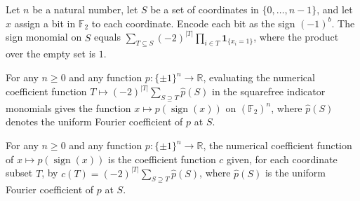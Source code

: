 \begin{theorem}
\label{FABL.monomial_binaryCubeSignEquiv_eq_numerical_sum}
\leanok
{}
Let $n$ be a natural number, let $S$ be a set of coordinates in $\{0,\ldots,n-1\}$,
and let $x$ assign a bit in $\mathbb{F}_2$ to each coordinate. Encode each bit as the
sign $(-1)^b$. The sign monomial on $S$ equals $\displaystyle\sum_{T\subseteq
S}(-2)^{|T|}\prod_{i\in T}\mathbf{1}_{\{x_i=1\}}$, where the product over the empty
set is $1$.
\end{theorem}

\begin{theorem}
\label{FABL.numericalEval_fourierSubstitutionCoeff}
\leanok
{}
For any $n\ge 0$ and any function $p:\{\pm1\}^n\to\mathbb{R}$, evaluating the numerical
coefficient function $T\mapsto(-2)^{|T|}\sum_{S\supseteq T}\widehat p(S)$ in the
squarefree indicator monomials gives the function $x\mapsto p(\operatorname{sign}(x))$
on $(\mathbb{F}_2)^n$, where $\widehat p(S)$ denotes the uniform Fourier coefficient of
$p$ at $S$.
\end{theorem}

\begin{theorem}
\label{FABL.numericalCoeff_fourierSubstitution}
\leanok
{}
For any $n\ge 0$ and any function $p:\{\pm1\}^n\to\mathbb{R}$, the numerical coefficient
function of $x\mapsto p(\operatorname{sign}(x))$ is the coefficient function $c$ given,
for each coordinate subset $T$, by $\displaystyle c(T)=(-2)^{|T|}\sum_{S\supseteq
T}\widehat p(S)$, where $\widehat p(S)$ is the uniform Fourier coefficient of $p$ at
$S$.
\end{theorem}

